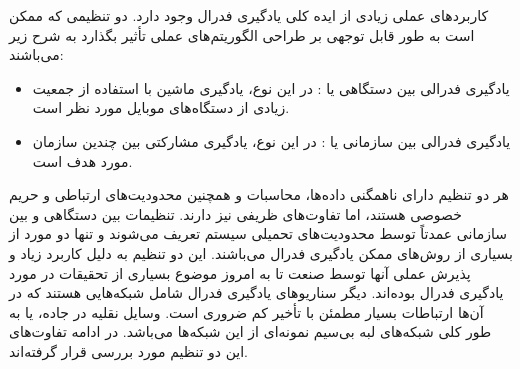 کاربردهای عملی زیادی از ایده کلی یادگیری فدرال وجود دارد. دو تنظیمی که ممکن است به طور قابل توجهی بر طراحی الگوریتم‌های عملی تأثیر بگذارد به شرح زیر می‌باشند:
\begin{itemize}
	\item 
	یادگیری فدرالی بین دستگاهی یا : در این نوع، یادگیری ماشین با استفاده از جمعیت زیادی از دستگاه‌های موبایل مورد نظر است.
	\item 
	یادگیری فدرالی بین سازمانی یا : در این نوع، یادگیری مشارکتی بین چندین سازمان مورد هدف است.
\end{itemize}

هر دو تنظیم دارای ناهمگنی داده‌ها، محاسبات و همچنین محدودیت‌های ارتباطی و حریم خصوصی هستند، اما تفاوت‌های ظریفی نیز دارند. تنظیمات بین دستگاهی و بین سازمانی عمدتاً توسط محدودیت‌های تحمیلی سیستم تعریف می‌شوند و تنها دو مورد از بسیاری از روش‌های ممکن یادگیری فدرال می‌باشند. این دو تنظیم به دلیل کاربرد زیاد و پذیرش عملی آنها توسط صنعت تا به امروز موضوع بسیاری از تحقیقات در مورد یادگیری فدرال بوده‌اند. دیگر سناریوهای یادگیری فدرال شامل شبکه‌هایی هستند که در آن‌ها ارتباطات بسیار مطمئن با تأخیر کم ضروری است. وسایل نقلیه در جاده، یا به طور کلی شبکه‌های لبه بی‌سیم نمونه‌ای از این شبکه‌ها می‌باشد. در ادامه تفاوت‌های این دو تنظیم مورد بررسی قرار گرفته‌اند.
